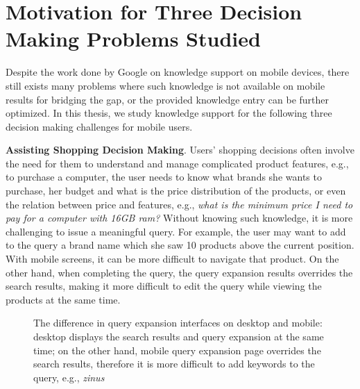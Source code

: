 
\section{Motivation for Three Decision Making Problems Studied}
\label{ch1:sec3:overview}

Despite the work done by Google on knowledge support on mobile devices, there still exists many problems where such knowledge is not available on mobile results for bridging the gap, or the provided knowledge entry can be further optimized. In this thesis, we study knowledge support for the following three decision making challenges for mobile users. 

\textbf{Assisting Shopping Decision Making}. Users' shopping decisions often involve the need for them to understand and manage complicated product features, e.g., to purchase a computer, the user needs to know what brands she wants to purchase, her budget and what is the price distribution of the products, or even the relation between price and features, e.g., \emph{what is the minimum price I need to pay for a computer with 16GB ram?} Without knowing such knowledge, it is more challenging to issue a meaningful query. For example, the user may want to add to the query a brand name which she saw 10 products above the current position. With mobile screens, it can be more difficult to navigate that product. On the other hand, when completing the query, the query expansion results overrides the search results, making it more difficult to edit the query while viewing the products at the same time. 

\begin{figure}[h]
\centering
{}\hfill
{}
\caption{The difference in query expansion interfaces on desktop and mobile: desktop displays the search results and query expansion at the same time; on the other hand, mobile query expansion page overrides the search results, therefore it is more difficult to add keywords to the query, e.g., \emph{zinus}}
\end{figure}

